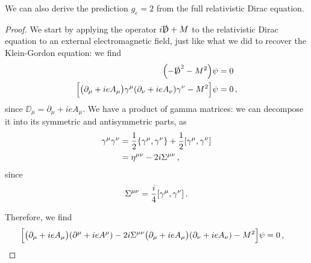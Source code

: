 \documentclass[main.tex]{subfiles}
\begin{document}
\begin{claim}
We can also derive the prediction \(g_e = 2\) from the full relativistic Dirac equation.
\end{claim}

\begin{proof}
We start by applying the operator \(i\slashed{\mathrm{D}} + M\) to the relativistic Dirac equation to an external electromagnetic field, just like what we did to recover the Klein-Gordon equation: we find 
%
\begin{align}
\qty(-\slashed{\mathrm{D}}^2 - M^2) \psi &= 0  \\
\qty[ \qty(\partial_{\mu } +ieA_{\mu }) \gamma^{\mu } \qty(\partial_{\nu } + ieA_{\nu }) \gamma^{\nu } - M^2] \psi  & =0
\,,
\end{align}
%
since \(\DD_{\mu } = \partial_{\mu } + ieA_{\mu }\).
We have a product of gamma matrices: we can decompose it into its symmetric and antisymmetric parts, as 
%
\begin{align}
\gamma^{\mu } \gamma^{\nu } &= \frac{1}{2} \qty{\gamma^{\mu }, \gamma^{\nu }}  + \frac{1}{2} \qty[\gamma^{\mu } , \gamma^{\nu }]\\
&= \eta^{\mu \nu } -2i \Sigma^{\mu \nu }
\,,
\end{align}
%
since 
%
\begin{align}
\Sigma^{\mu \nu } = \frac{i}{4} \qty[\gamma^{\mu }, \gamma^{\nu }]
\,.
\end{align}

Therefore, we find 
%
\begin{align}
\qty[\qty(\partial_{\mu } + i e A_{\mu }) \qty(\partial^{\mu } + i e A^{\mu }) - 2i \Sigma^{\mu \nu } \qty(\partial_{\mu } +ieA_{\mu }) \qty(\partial_{\nu } + ieA_{\nu }) - M^2] \psi &= 0
\,,
\end{align}
%


\end{proof}
\end{document}
